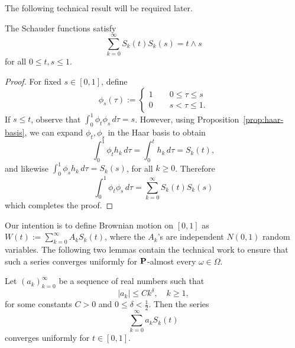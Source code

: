 The following technical result will be required later.
\begin{lemma}
\label{lem:Skt}
    The Schauder functions satisfy
    \begin{equation*}
        \sum_{k=0}^\infty S_k(t)S_k(s) = t\wedge s
    \end{equation*}
    for all $0\le t,s\le 1$.
\end{lemma}

\begin{proof}
    For fixed $s\in [0,1]$, define
    \begin{equation*}
        \phi_s(\tau) := \begin{cases}
            1 \qquad 0\le\tau\le s \\
            0 \qquad s<\tau\le 1.
        \end{cases}
    \end{equation*}
    If $s\le t$, observe that $\int_0^1 \phi_t \phi_s\,d\tau = s$. However, using Proposition~\ref{prop:haar-basis}, we can expand $\phi_t, \phi_s$ in the Haar basis to obtain
    \begin{equation*}
        \int_0^1 \phi_t h_k\,d\tau = \int_0^t h_k\,d\tau = S_k(t),
    \end{equation*}
    and likewise $\int_0^1 \phi_s h_k\,d\tau = S_k(s)$, for all $k\ge 0$. Therefore
    \begin{equation*}
        \int_0^1 \phi_t\phi_s\,d\tau = \sum_{k=0}^\infty S_k(t)S_k(s)
    \end{equation*}
    which completes the proof.
\end{proof}

Our intention is to define Brownian motion on $[0,1]$ as $W(t):=\sum_{k=0}^\infty A_k S_k(t)$, where the $A_k$'s are independent $N(0,1)$ random variables. The following two lemmas contain the technical work to ensure that such a series converges uniformly for $\mathbf{P}$-almost every $\omega\in\Omega$.

\begin{lemma}
\label{lem:unif-converge}
    Let $(a_k)_{k=0}^\infty$ be a sequence of real numbers such that
    \begin{equation*}
        |a_k|\le Ck^\delta, \quad k\ge 1,
    \end{equation*}
    for some constants $C>0$ and $0\le\delta <\frac{1}{2}$. Then the series
    \begin{equation*}
        \sum_{k=0}^\infty a_k S_k(t)
    \end{equation*}
    converges uniformly for $t\in [0,1]$.
\end{lemma}

